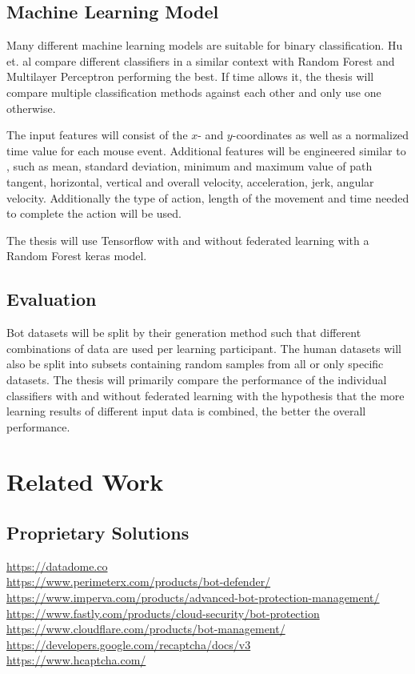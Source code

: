 \documentclass[
    fontsize=12pt,
    headings=small,
    parskip=half,           %
    bibliography=totoc,
    numbers=noenddot,       %
    open=any,               %
    ]{scrreprt}
\begin{document}
\section{Machine Learning Model}

Many different machine learning models are suitable for binary classification. Hu et. al \cite{8275816} compare different classifiers in a similar context with Random Forest and Multilayer Perceptron performing the best. If time allows it, the thesis will compare multiple classification methods against each other and only use one otherwise.

The input features will consist of the $x$- and $y$-coordinates as well as a normalized time value for each mouse event. Additional features will be engineered similar to \cite{DBLP:journals/corr/abs-1810-04668}, such as mean, standard deviation, minimum and maximum value of path tangent, horizontal, vertical and overall velocity, acceleration, jerk, angular velocity. Additionally the type of action, length of the movement and time needed to complete the action will be used.


The thesis will use Tensorflow with and without federated learning with a Random Forest keras model.

\section{Evaluation}

Bot datasets will be split by their generation method such that different combinations of data are used per learning participant.  The human datasets will also be split into subsets containing random samples from all or only specific datasets. The thesis will primarily compare the performance of the individual classifiers with and without federated learning with the hypothesis that the more learning results of different input data is combined, the better the overall performance.


\chapter{Related Work}

\section{Proprietary Solutions}

\url{https://datadome.co} \\
\url{https://www.perimeterx.com/products/bot-defender/} \\
\url{https://www.imperva.com/products/advanced-bot-protection-management/} \\
\url{https://www.fastly.com/products/cloud-security/bot-protection} \\
\url{https://www.cloudflare.com/products/bot-management/} \\
\url{https://developers.google.com/recaptcha/docs/v3} \\
\url{https://www.hcaptcha.com/} \\
\end{document}
